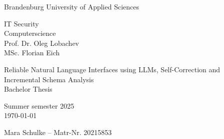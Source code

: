 \begin{titlepage}
    \begin{center}
        \begin{Large}
            Brandenburg University of Applied Sciences \\[1em]
        \end{Large}
        IT Security \\
        Computerscience \\
        Prof. Dr. Oleg Lobachev \\
        MSc. Florian Eich
    \end{center}

    \vfill

    \begin{center}
        \Large{Reliable Natural Language Interfaces using LLMs, Self-Correction and Incremental Schema Analysis}\\[0.5em]
        \large{Bachelor Thesis}\\[1em]
        
        \begin{normalsize}
            Summer semester 2025\\[0.25em]
            \today
        \end{normalsize}
    \end{center}

    \vfill

    \begin{center}
        Mara Schulke – Matr-Nr. 20215853
    \end{center}
\end{titlepage}
